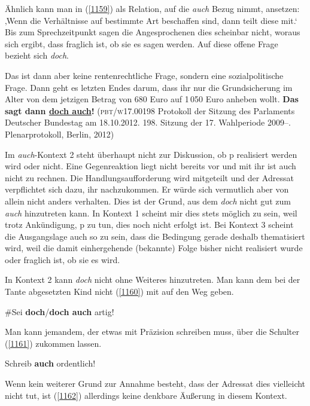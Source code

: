 Ähnlich kann man in (\ref{1159}) als Relation, auf die \textit{auch} Bezug nimmt, ansetzen: ‚Wenn die Verhältnisse auf bestimmte Art beschaffen sind, dann teilt diese mit.‘ Bis zum Sprechzeitpunkt sagen die Angesprochenen dies scheinbar nicht, woraus sich ergibt, dass fraglich ist, ob sie es sagen werden. Auf diese offene Frage bezieht sich \textit{doch}.
	
\begin{exe}
	\ex\label{1159} 

	Das ist dann aber keine rentenrechtliche Frage, sondern eine sozialpolitische Frage. Dann geht es letzten Endes darum, dass ihr nur die Grundsicherung 		im Alter von dem jetzigen Betrag von 680 Euro auf 1\,050 Euro anheben wollt. \textbf{Das sagt dann \ul{doch auch}!}
	\newline
	(\textsc{pbt/w17.00198} Protokoll der Sitzung des Parlaments Deutscher Bundestag am 18.10.2012. 198. Sitzung der 17. Wahlperiode 2009--. Plenarprotokoll, Berlin, 2012)
\end{exe}	
Im \textit{auch}-Kontext 2 steht überhaupt nicht zur Diskussion, ob p realisiert werden wird oder nicht. Eine Gegenreaktion liegt nicht bereits vor und mit ihr ist auch nicht zu rechnen. Die Handlungsaufforderung wird mitgeteilt und der Adressat verpflichtet sich dazu, ihr nachzukommen. Er würde sich vermutlich aber von allein nicht anders verhalten. Dies ist der Grund, aus dem \textit{doch} nicht gut zum \textit{auch} hinzutreten kann. In Kontext 1 scheint mir dies stets möglich zu sein, weil trotz Ankündigung, p zu tun, dies noch nicht erfolgt ist. Bei Kontext 3 scheint die Ausgangslage auch so zu sein, dass die Bedingung gerade deshalb thematisiert wird, weil die damit einhergehende (bekannte) Folge bisher nicht realisiert wurde oder fraglich ist, ob sie es wird.

In Kontext 2 kann \textit{doch} nicht ohne Weiteres hinzutreten. Man kann dem bei der Tante abgesetzten Kind nicht (\ref{1160}) mit auf den Weg geben.

\begin{exe}
	\ex\label{1160} 
	\#Sei \textbf{doch}/\textbf{doch auch} artig!
\end{exe}	
Man kann jemandem, der etwas mit Präzision schreiben muss, über die Schulter (\ref{1161}) zukommen lassen.

\begin{exe}
	\ex\label{1161} 
	Schreib \textbf{auch} ordentlich!
\end{exe}	
Wenn kein weiterer Grund zur Annahme besteht, dass der Adressat dies viel\-leicht nicht tut, ist (\ref{1162}) allerdings keine denkbare Äußerung in diesem Kontext.

